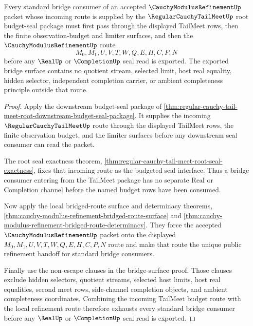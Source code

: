 \begin{theorem}
\label{thm:cauchy-modulus-refinement-bridge-consumer-route-exhaustion}
Every standard bridge consumer of an accepted $\CauchyModulusRefinementUp$ packet whose incoming route is supplied by the $\RegularCauchyTailMeetUp$ root budget-seal package must first pass through the displayed TailMeet rows, then the finite observation-budget and limiter surfaces, and then the $\CauchyModulusRefinementUp$ route
$$
M_0,M_1,U,V,T,W,Q,E,H,C,P,N
$$
before any $\RealUp$ or $\CompletionUp$ seal read is exported. The exported bridge surface contains no quotient stream, selected limit, host real equality, hidden selector, independent completion carrier, or ambient completeness principle outside that route.
\end{theorem}
\begin{proof}
Apply the downstream budget-seal package of \autoref{thm:regular-cauchy-tail-meet-root-downstream-budget-seal-package}. It supplies the incoming $\RegularCauchyTailMeetUp$ route through the displayed TailMeet rows, the finite observation budget, and the limiter surfaces before any downstream seal consumer can read the packet.

The root seal exactness theorem, \autoref{thm:regular-cauchy-tail-meet-root-seal-exactness}, fixes that incoming route as the budgeted seal interface. Thus a bridge consumer entering from the TailMeet package has no separate Real or Completion channel before the named budget rows have been consumed.

Now apply the local bridged-route surface and determinacy theorems, \autoref{thm:cauchy-modulus-refinement-bridged-route-surface} and \autoref{thm:cauchy-modulus-refinement-bridged-route-determinacy}. They force the accepted $\CauchyModulusRefinementUp$ packet onto the displayed $M_0,M_1,U,V,T,W,Q,E,H,C,P,N$ route and make that route the unique public refinement handoff for standard bridge consumers.

Finally use the non-escape clauses in the bridge-surface proof. Those clauses exclude hidden selectors, quotient streams, selected host limits, host real equalities, second meet rows, side-channel completion objects, and ambient completeness coordinates. Combining the incoming TailMeet budget route with the local refinement route therefore exhausts every standard bridge consumer before any $\RealUp$ or $\CompletionUp$ seal read is exported.
\end{proof}

